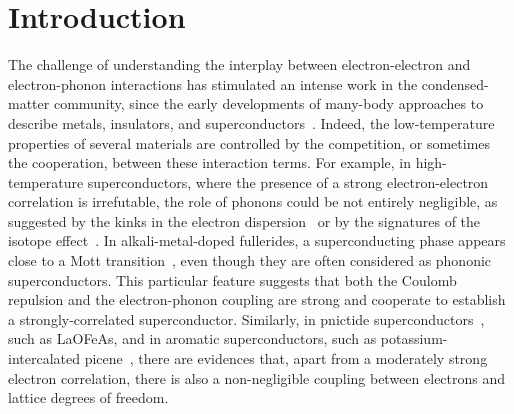 \documentclass[aps,superscriptaddress,amsmath,amssymb,twocolumn,showpacs,floatfix,english]{revtex4}
\begin{document}
\section{Introduction}\label{sec:intro}

The challenge of understanding the interplay between electron-electron and electron-phonon interactions has stimulated an intense 
work in the condensed-matter community, since the early developments of many-body approaches to describe metals, insulators, and 
superconductors~\cite{AbrikosovBook}. Indeed, the low-temperature properties of several materials are controlled by the competition, 
or sometimes the cooperation, between these interaction terms. For example, in high-temperature superconductors, where the presence 
of a strong electron-electron correlation is irrefutable, the role of phonons could be not entirely negligible, as suggested by the 
kinks in the electron dispersion~\cite{Lanzara2001} or by the signatures of the isotope effect~\cite{Zhao1997,Gweon2004}. In alkali-metal-doped 
fullerides, a superconducting phase appears close to a Mott transition~\cite{Capone2009,Takabayashi2009}, even though they are often 
considered as phononic superconductors. This particular feature suggests that both the Coulomb repulsion and the electron-phonon coupling
are strong and cooperate to establish a strongly-correlated superconductor. Similarly, in pnictide superconductors~\cite{Cruz2008}, 
such as LaOFeAs, and in aromatic superconductors, such as potassium-intercalated picene~\cite{Mitsuhashi2010}, there are evidences that, 
apart from a moderately strong electron correlation, there is also a non-negligible coupling between electrons and lattice degrees of 
freedom. 
\end{document}
